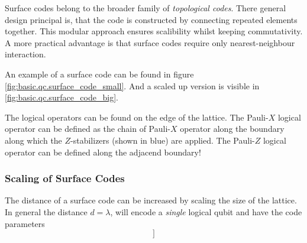 Surface codes belong to the broader family of \textit{topological codes}.
There general design principal is, that the code is constructed by connecting repeated elements together. 
This modular approach ensures scalibility whilst keeping commutativity.
A more practical advantage is that surface codes require only nearest-neighbour interaction.

An example of a surface code can be found in figure \ref{fig:basic.qc.surface_code_small}.
And a scaled up version is visible in \ref{fig:basic.qc.surface_code_big}.

The logical operators can be found on the edge of the lattice. 
The Pauli-$X$ logical operator can be defined as the chain of Pauli-$X$ operator along the boundary along which the $Z$-stabilizers (shown in blue) are applied.
The Pauli-$Z$ logical operator can be defined along the adjacend boundary!

\subsubsection{Scaling of Surface Codes}
The distance of a surface code can be increased by scaling the size of the lattice.
In general the distance $d=\lambda$, will encode a \textit{single} logical qubit and have the code parameters
\begin{equation}
    [[n = \lambda^2 + (\lambda-1)^2, k=1 ]]
\end{equation}


